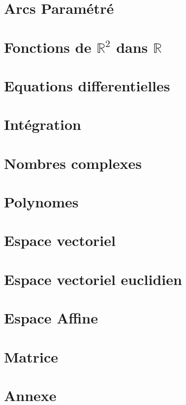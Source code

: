 \documentclass[a4paper, titlepage,twoside]{book}
\begin{document}
\part{Arcs Param\'etr\'e}


\part{Fonctions de $\mathbb{R}^2$ dans $\mathbb{R}$}

\part{Equations differentielles}


\part{Int\'egration}

\part{Nombres complexes}


\part{Polynomes}

\part{Espace vectoriel}


\part{Espace vectoriel euclidien}



\part{Espace Affine}


\part{Matrice}


\appendix                     %
\part{Annexe}









\backmatter
\tableofcontents            %
\end{document}
